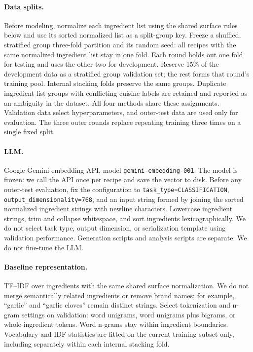 ﻿\documentclass[11pt,letterpaper]{article}
\begin{document}
\paragraph{Data splits.}
Before modeling, normalize each ingredient list using the shared surface rules below and use its sorted normalized list as a split-group key. Freeze a shuffled, stratified group three-fold partition and its random seed: all recipes with the same normalized ingredient list stay in one fold. Each round holds out one fold for testing and uses the other two for development. Reserve 15\% of the development data as a stratified group validation set; the rest forms that round's training pool. Internal stacking folds preserve the same groups. Duplicate ingredient-list groups with conflicting cuisine labels are retained and reported as an ambiguity in the dataset. All four methods share these assignments. Validation data select hyperparameters, and outer-test data are used only for evaluation. The three outer rounds replace repeating training three times on a single fixed split.

\paragraph{LLM.}
Google Gemini embedding API, model \texttt{gemini-embedding-001}. The model is frozen: we call the API once per recipe and save the vector to disk. Before any outer-test evaluation, fix the configuration to \texttt{task\_type=CLASSIFICATION}, \texttt{output\_dimensionality=768}, and an input string formed by joining the sorted normalized ingredient strings with newline characters. Lowercase ingredient strings, trim and collapse whitespace, and sort ingredients lexicographically. We do not select task type, output dimension, or serialization template using validation performance. Generation scripts and analysis scripts are separate. We do not fine-tune the LLM.

\paragraph{Baseline representation.}
TF--IDF over ingredients with the same shared surface normalization. We do not merge semantically related ingredients or remove brand names; for example, ``garlic'' and ``garlic cloves'' remain distinct strings. Select tokenization and n-gram settings on validation: word unigrams, word unigrams plus bigrams, or whole-ingredient tokens. Word n-grams stay within ingredient boundaries. Vocabulary and IDF statistics are fitted on the current training subset only, including separately within each internal stacking fold.
\end{document}
